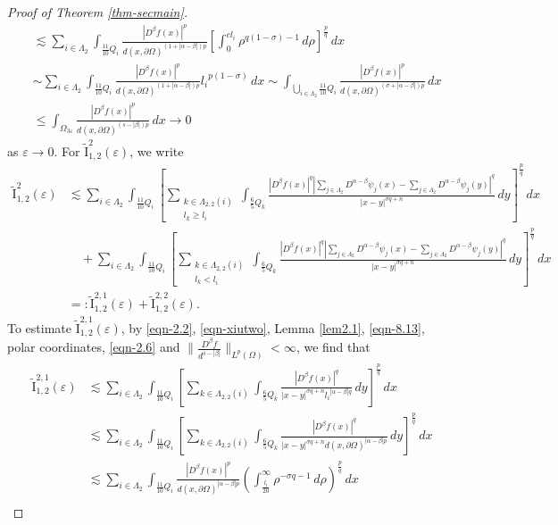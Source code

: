 \documentclass[11pt,twoside]{article}
\def\Qi{\frac{11}{10}Q_i}
\def\Qkk{\frac{6}{5}Q_k}
\def\az{\alpha}
\def\bz{\beta}
\def\boz{{\Omega}}
\def\sz{\sigma}
\def\vez{\varepsilon}
\def\pa{\partial}                %
\def\huae{\varepsilon}
\def\bozthreee{\boz_{3\huae}}
\theoremstyle{mylem}
\theoremstyle{definition}
\numberwithin{equation}{section}
\begin{document}
\begin{proof}[Proof of Theorem \ref{thm-secmain}]
\begin{align}
&\lesssim \sum_{i \in \Lambda_2} \int_{\Qi} \frac{ |D^\bz f(x)|^p}{{d(x,\pa\boz)}^{(1+|\az-\bz|)p}} \left[ \int_0^{cl_i} \rho^{q(1 - \sz) - 1}\,d\rho \right]^{\frac{p}{q}}\,dx \nonumber \\
&\sim \sum_{i \in \Lambda_2} \int_{\Qi} \frac{ |D^\bz f(x)|^p}{{d(x,\pa\boz)}^{(1+|\az-\bz|)p}}  {l_i}^{p(1-\sz)}\,dx
\sim \int_{\bigcup_{i \in \Lambda_2} \Qi} \frac{|D^\bz f(x)|^p}{d(x, \partial\Omega)^{(\sz+|\az-\bz|) p}}\,dx  \nonumber \\
&\leq \int_{\bozthreee}\frac{|D^\bz f(x)|^p}{d(x, \partial\Omega)^{(s-|\bz|) p}}\,dx \to 0
\end{align}
as $\varepsilon \to 0.$ For $\tilde{\mathrm{I}}_{1,2}^2(\vez)$, we write
\begin{align*}
\tilde{\mathrm{I}}_{1,2}^2(\vez)
&\lesssim \sum_{i \in \Lambda_2} \int_{\Qi} \left[ \sum_{\substack{k\in\Lambda_{2,2}(i) \\ l_k\geq l_i}}\int_{\Qkk} \frac{|D^\beta f(x)|^q |\sum_{j\in\Lambda_2}D^{\alpha - \beta} \psi_j(x) - \sum_{j\in\Lambda_2}D^{\alpha - \beta} \psi_j(y)|^q}{|x - y|^{\sz q + n}}\,dy \right]^{\frac{p}{q}}\,dx \nonumber \\
&\quad+\sum_{i \in \Lambda_2} \int_{\Qi} \left[ \sum_{\substack{k\in\Lambda_{2,2}(i) \\ l_k< l_i}}\int_{\Qkk} \frac{|D^\beta f(x)|^q |\sum_{j\in\Lambda_2}D^{\alpha - \beta} \psi_j(x) - \sum_{j\in\Lambda_2}D^{\alpha - \beta} \psi_j(y)|^q}{|x - y|^{\sz q + n}}\,dy \right]^{\frac{p}{q}}\,dx \nonumber \\
&=:\tilde{\mathrm{I}}_{1,2}^{2,1}(\vez)+\tilde{\mathrm{I}}_{1,2}^{2,2}(\vez).
\end{align*} 
To estimate $\tilde{\mathrm{I}}_{1,2}^{2,1}(\vez)$, by \eqref{eqn-2.2}, \eqref{eqn-xiutwo}, Lemma \ref{lem2.1}, \eqref{eqn-8.13}, polar coordinates, \eqref{eqn-2.6} and 
$\|\frac{D^\beta f}{d^{s-|\beta|}}\|_{L^p(\Omega)}<\infty$, we find that
\begin{align}\label{eqn-4.30}
\tilde{\mathrm{I}}_{1,2}^{2,1}(\vez)
&\lesssim  \sum_{i \in \Lambda_2} \int_{\Qi} \left[ \sum_{k \in \Lambda_{2,2}(i)} \int_{\Qkk} \frac{| D^\bz f(x)|^q }{|x - y|^{\sz q + n}{l_i}^{|\az-\bz|q}}\,dy \right]^{\frac{p}{q}}\,dx \nonumber \\
&\lesssim \sum_{i \in \Lambda_2} \int_{\Qi} \left[ \sum_{k \in \Lambda_{2,2}(i)} \int_{\Qkk} \frac{|D^\bz f(x)|^q }{|x - y|^{\sz q + n}{d(x,\pa\boz)}^{|\az-\bz|p}}\,dy \right]^{\frac{p}{q}}\,dx \nonumber \\
&\lesssim \sum_{i \in \Lambda_2} \int_{\Qi} \frac{ |D^\bz f(x)|^p}{{d(x,\pa\boz)}^{|\az-\bz|p}} \left( \int_{\frac{l_i}{20}}^{\infty} \rho^{- \sz q - 1}\,d\rho \right)^{\frac{p}{q}}\,dx \nonumber \\

\end{align}
\end{proof}
\end{document}
